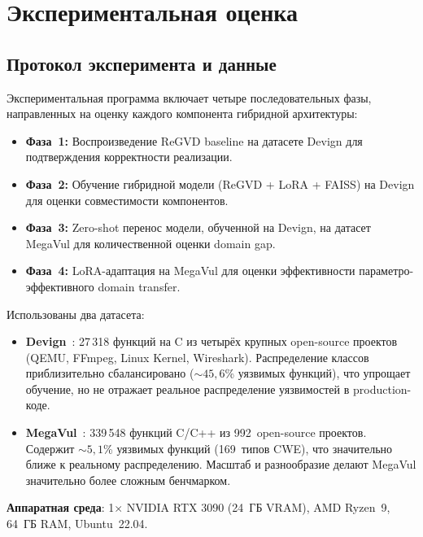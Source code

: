 \documentclass[runningheads]{llncs}
\begin{document}
\section{Экспериментальная оценка}

\subsection{Протокол эксперимента и данные}

Экспериментальная программа включает четыре последовательных фазы, направленных на оценку каждого компонента гибридной архитектуры:

\begin{itemize}
    \item \textbf{Фаза~1:} Воспроизведение ReGVD baseline на датасете Devign для подтверждения корректности реализации.
    \item \textbf{Фаза~2:} Обучение гибридной модели (ReGVD + LoRA + FAISS) на Devign для оценки совместимости компонентов.
    \item \textbf{Фаза~3:} Zero-shot перенос модели, обученной на Devign, на датасет MegaVul для количественной оценки domain gap.
    \item \textbf{Фаза~4:} LoRA-адаптация на MegaVul для оценки эффективности параметро-эффективного domain transfer.
\end{itemize}

Использованы два датасета:
\begin{itemize}
    \item \textbf{Devign}~\cite{zhou2019devign}: 27\,318 функций на C из четырёх крупных open-source проектов (QEMU, FFmpeg, Linux Kernel, Wireshark). Распределение классов приблизительно сбалансировано (${\sim}45{,}6$\% уязвимых функций), что упрощает обучение, но не отражает реальное распределение уязвимостей в production-коде.
    \item \textbf{MegaVul}~\cite{ni2024megavul}: 339\,548 функций C/C++ из 992~open-source проектов. Содержит ${\sim}5{,}1$\% уязвимых функций (169~типов CWE), что значительно ближе к реальному распределению. Масштаб и разнообразие делают MegaVul значительно более сложным бенчмарком.
\end{itemize}

\textbf{Аппаратная среда}: 1$\times$ NVIDIA RTX 3090 (24~ГБ VRAM), AMD Ryzen~9, 64~ГБ RAM, Ubuntu~22.04.
\end{document}
